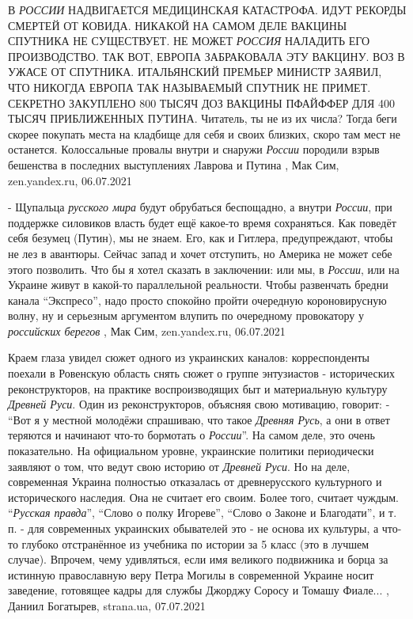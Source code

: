 В \emph{РОССИИ} НАДВИГАЕТСЯ МЕДИЦИНСКАЯ КАТАСТРОФА. ИДУТ РЕКОРДЫ СМЕРТЕЙ ОТ КОВИДА.
НИКАКОЙ НА САМОМ ДЕЛЕ ВАКЦИНЫ СПУТНИКА НЕ СУЩЕСТВУЕТ. НЕ МОЖЕТ \emph{РОССИЯ} НАЛАДИТЬ
ЕГО ПРОИЗВОДСТВО. ТАК ВОТ, ЕВРОПА ЗАБРАКОВАЛА ЭТУ ВАКЦИНУ. ВОЗ В УЖАСЕ ОТ
СПУТНИКА. ИТАЛЬЯНСКИЙ ПРЕМЬЕР МИНИСТР ЗАЯВИЛ, ЧТО НИКОГДА ЕВРОПА ТАК НАЗЫВАЕМЫЙ
СПУТНИК НЕ ПРИМЕТ. СЕКРЕТНО ЗАКУПЛЕНО 800 ТЫСЯЧ ДОЗ ВАКЦИНЫ ПФАЙФФЕР ДЛЯ 400
ТЫСЯЧ ПРИБЛИЖЕННЫХ ПУТИНА.  Читатель, ты не из их числа? Тогда беги скорее
покупать места на кладбище для себя и своих близких, скоро там мест не
останется.  Колоссальные провалы внутри и снаружи \emph{России} породили взрыв
бешенства в последних выступлениях Лаврова и Путина
, 
Мак Сим, zen.yandex.ru, 06.07.2021

- Щупальца \emph{русского мира} будут обрубаться беспощадно, а внутри \emph{России}, при
поддержке силовиков власть будет ещё какое-то время сохраняться. Как поведёт
себя безумец (Путин), мы не знаем. Его, как и Гитлера, предупреждают, чтобы не
лез в авантюры. Сейчас запад и хочет отступить, но Америка не может себе этого
позволить.
Что бы я хотел сказать в заключении: или мы, в \emph{России}, или на Украине живут в
какой-то параллельной реальности. Чтобы развенчать бредни канала \enquote{Экспресо},
надо просто спокойно пройти очередную короновирусную волну, ну и серьезным
аргументом влупить по очередному провокатору у \emph{российских берегов}
, 
Мак Сим, zen.yandex.ru, 06.07.2021


Краем глаза увидел сюжет одного из украинских каналов: корреспонденты поехали в
Ровенскую область снять сюжет о группе энтузиастов - исторических
реконструкторов, на практике воспроизводящих быт и материальную культуру
\emph{Древней Руси}. Один из реконструкторов, объясняя свою мотивацию, говорит: - \enquote{Вот
я у местной молодёжи спрашиваю, что такое \emph{Древняя Русь}, а они в ответ теряются
и начинают что-то бормотать о \emph{России}}.  На самом деле, это очень показательно.
На официальном уровне, украинские политики периодически заявляют о том, что
ведут свою историю от \emph{Древней Руси}. Но на деле, современная Украина полностью
отказалась от древнерусского культурного и исторического наследия. Она не
считает его своим. Более того, считает чуждым.  \enquote{\emph{Русская правда}}, \enquote{Слово о
полку Игореве}, \enquote{Слово о Законе и Благодати}, и т. п. - для современных
украинских обывателей это - не основа их культуры, а что-то глубоко
отстранённое из учебника по истории за 5 класс (это в лучшем случае).  Впрочем,
чему удивляться, если имя великого подвижника и борца за истинную православную
веру Петра Могилы в современной Украине носит заведение, готовящее кадры для
службы Джорджу Соросу и Томашу Фиале...
, 
Даниил Богатырев, strana.ua, 07.07.2021

